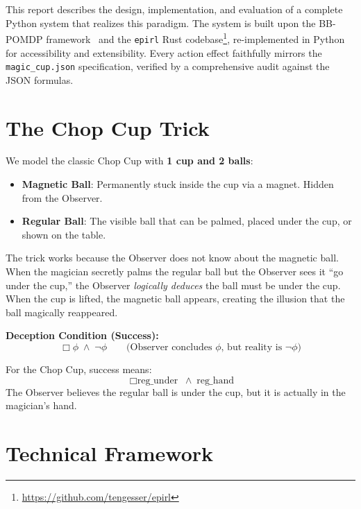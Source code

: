 \documentclass[11pt]{article}
\newcommand{\IBel}[1]{\ensuremath{\Box #1}}   %
\begin{document}
This report describes the design, implementation, and evaluation of a complete Python system that realizes this paradigm. The system is built upon the BB-POMDP framework~\cite{engesser2025} and the \texttt{epirl} Rust codebase\footnote{\url{https://github.com/tengesser/epirl}}, re-implemented in Python for accessibility and extensibility. Every action effect faithfully mirrors the \texttt{magic\_cup.json} specification, verified by a comprehensive audit against the JSON formulas.

\section{The Chop Cup Trick}

We model the classic Chop Cup with \textbf{1 cup and 2 balls}:
\begin{itemize}
    \item \textbf{Magnetic Ball}: Permanently stuck inside the cup via a magnet. Hidden from the Observer.
    \item \textbf{Regular Ball}: The visible ball that can be palmed, placed under the cup, or shown on the table.
\end{itemize}

The trick works because the Observer does not know about the magnetic ball. When the magician secretly palms the regular ball but the Observer sees it ``go under the cup,'' the Observer \emph{logically deduces} the ball must be under the cup. When the cup is lifted, the magnetic ball appears, creating the illusion that the ball magically reappeared.

\textbf{Deception Condition (Success):}
\[
    \IBel{\phi} \;\land\; \neg\phi \qquad \text{(Observer concludes $\phi$, but reality is $\neg\phi$)}
\]

For the Chop Cup, success means:
\[
    \IBel{\text{reg\_under}} \;\land\; \text{reg\_hand}
\]
The Observer believes the regular ball is under the cup, but it is actually in the magician's hand.

\section{Technical Framework}
\end{document}
